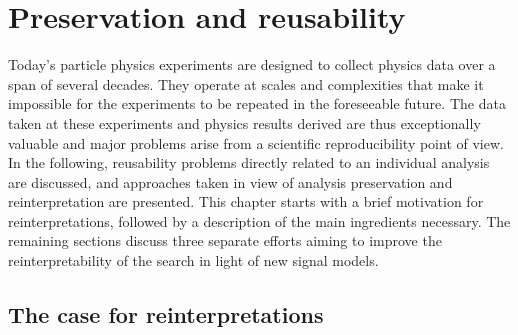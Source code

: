 
\chapter{Preservation and reusability}\label{ch:preservation}

\ifpdf
    \graphicspath{{chapter-preservation/Figs/Raster/}{chapter-preservation/Figs/PDF/}{chapter-preservation/Figs/}}
\else
    \graphicspath{{chapter-preservation/Figs/Vector/}{chapter-preservation/Figs/}}
\fi

Today's particle physics experiments are designed to collect physics data over a span of several decades. They operate at scales and complexities that make it impossible for the experiments to be repeated in the foreseeable future.
The data taken at these experiments and physics results derived are thus exceptionally valuable and major problems arise from a scientific reproducibility point of view. In the following, reusability problems directly related to an individual analysis are discussed, and approaches taken in view of analysis preservation and reinterpretation are presented.
This chapter starts with a brief motivation for reinterpretations, followed by a description of the main ingredients necessary.
The remaining sections discuss three separate efforts aiming to improve the reinterpretability of the \onelepton search in light of new signal models.

\section{The case for reinterpretations}\label{sec:reinterpretations}

